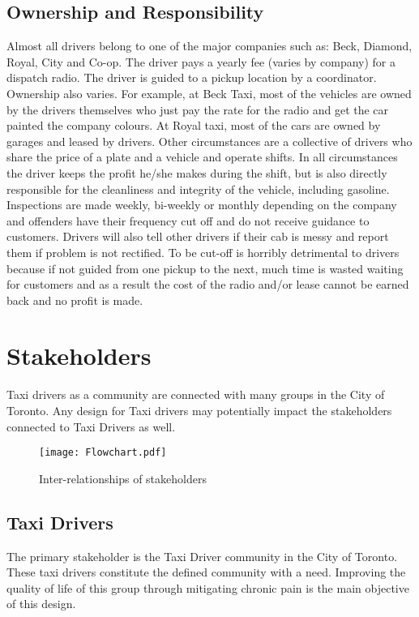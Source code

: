 \documentclass[11pt]{article}
\begin{document}
\subsection{Ownership and Responsibility}

Almost all drivers belong to one of the major companies such as: Beck, Diamond, Royal, City and
Co-op. The driver pays a yearly fee (varies by company) for a dispatch radio. The 
driver is guided to a pickup location by a coordinator. Ownership also varies. For example, 
at Beck Taxi, most of the vehicles are owned by the drivers themselves who just pay the 
rate for the radio and get the car painted the company colours. At Royal taxi, most of the 
cars are owned by garages and leased by drivers. Other circumstances are a collective of 
drivers who share the price of a plate and a vehicle and operate shifts. In all 
circumstances the driver keeps the profit he/she makes during the shift, but is also 
directly responsible for the cleanliness and integrity of the vehicle, including gasoline. 
Inspections are made weekly, bi-weekly or monthly depending on the company and offenders 
have their frequency cut off and do not receive guidance to customers. Drivers will also 
tell other drivers if their cab is messy and report them if problem is not rectified. To 
be cut-off is horribly detrimental to drivers because if not guided from one pickup to 
the next, much time is wasted waiting for customers and as a result the cost of the radio 
and/or lease cannot be earned back and no profit is made\cite{thestar2012, Gowder2013}.

\section{Stakeholders}
\label{sec:stake}
Taxi drivers as a community are connected with many groups in the City
of Toronto. Any design for Taxi drivers may potentially impact the
stakeholders connected to Taxi Drivers as well.
\begin{figure}[h]
  \centering
  \texttt{[image: Flowchart.pdf]}
  \caption{Inter-relationships of stakeholders}
\end{figure}
\subsection{Taxi Drivers}
The primary stakeholder is the Taxi Driver community in the City of
Toronto. These taxi drivers constitute the defined community with a
need. Improving the quality of life of this group through mitigating
chronic pain is the main objective of this design.
 
\end{document}
